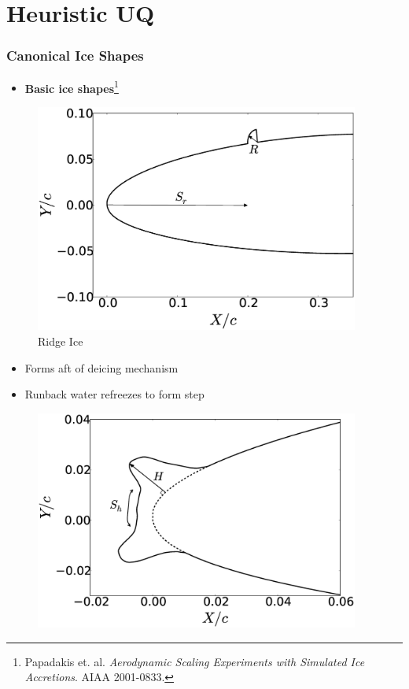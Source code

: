 \documentclass[9pt]{beamer}
\begin{document}
\section{Heuristic UQ}
\label{sec-2}
\begin{frame}
\frametitle{Canonical Ice Shapes}
\label{sec-2-1}

\begin{itemize}
\item \textbf{Basic ice shapes}\footnote{Papadakis et. al. \emph{Aerodynamic Scaling Experiments with Simulated Ice Accretions}. AIAA 2001-0833.
 }
\end{itemize}
\centering
\vspace{-0.5cm}
\begin{minipage}[t]{0.4\linewidth}
\begin{figure}[t]
\includegraphics[width=0.95\textwidth]{RidgeParameters}
\caption{Ridge Ice}
\end{figure}
\vspace{-0.5cm}
\begin{itemize}
\item Forms aft of deicing mechanism
\item Runback water refreezes to form step
\end{itemize}
\end{minipage}
\begin{minipage}[t]{0.4\linewidth}
\begin{figure}[t]
\includegraphics[width=0.95\textwidth]{NominalHorn}

\end{figure}
\end{minipage}
\end{frame}
\end{document}
